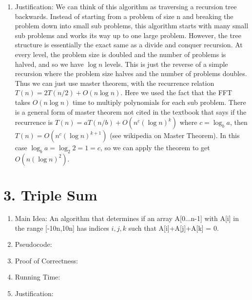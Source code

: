 \documentclass[11pt]{article}
\begin{document}
\begin{enumerate}
\item Justification: We can think of this algorithm as traversing a recursion tree backwards. Instead of starting from a problem of size n and breaking the problem down into small sub problems, this algorithm starts with many small sub problems and works its way up to one large problem. However, the tree structure is essentially the exact same as a divide and conquer recursion. At every level, the problem size is doubled and the number of problems is halved, and so we have $\log n$ levels. This is just the reverse of a simple recursion where the problem size halves and the number of problems doubles. Thus we can just use master theorem, with the recurrence relation $T(n)=2T(n/2)+O(n\log n)$. Here we used the fact that the FFT takes $O(n\log n)$ time to multiply polynomials for each sub problem. There is a general form of master theorem not cited in the textbook that says if the recurrence is $T(n)=aT(n/b)+O(n^c (\log n)^k)$ where $c=\log_b a$, then $T(n)=O(n^c (\log n)^{k+1})$ (see wikipedia on Master Theorem). In this case $\log_b a = \log_2 2 = 1 = c$, so we can apply the theorem to get $O(n(\log n)^2)$.
\end{enumerate}

\newpage
\section*{3. Triple Sum}
\begin{enumerate}
\item Main Idea: An algorithm that determines if an array A[0...n-1] with A[i] in the range [-10n,10n] has indices $i,j,k$ such that A[i]+A[j]+A[k] = 0.
\item Pseudocode:
\item Proof of Correctness:
\item Running Time:
\item Justification:
\end{enumerate}


\newpage
\end{document}
